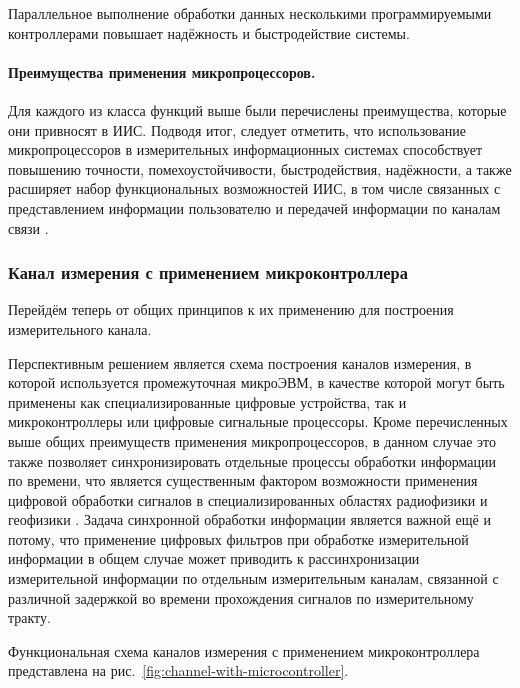 \documentclass[a4paper, 14pt, titlepage]{extarticle}
\let\oldparagraph\paragraph
\renewcommand{\paragraph}[1]{\oldparagraph{\indent #1}}
\begin{document}
  Параллельное выполнение обработки данных несколькими программируемыми
  контроллерами повышает надёжность и быстродействие системы.

  \paragraph{Преимущества применения микропроцессоров.}
  Для каждого из класса функций выше были перечислены преимущества, которые они привносят в ИИС.
  Подводя итог, следует отметить, что использование микропроцессоров в измерительных информационных системах способствует
  повышению точности, помехоустойчивости, быстродействия, надёжности, а также расширяет набор
  функциональных возможностей ИИС, в том числе связанных с представлением информации пользователю
  и передачей информации по каналам связи \cite{klaassen-methods}.

  \subsubsection{Канал измерения с применением микроконтроллера}

  Перейдём теперь от общих принципов к их применению для построения измерительного канала.

  Перспективным решением является схема построения каналов измерения, в которой
  используется промежуточная микроЭВМ, в качестве которой могут быть применены как
  специализированные цифровые устройства, так и микроконтроллеры или цифровые сигнальные процессоры.
  Кроме перечисленных выше общих преимуществ применения микропроцессоров, в данном случае это также
  позволяет синхронизировать отдельные процессы обработки информации по времени, что является
  существенным фактором возможности применения цифровой обработки сигналов в специализированных
  областях радиофизики и геофизики \cite{rathore-digital}. Задача синхронной обработки информации
  является важной ещё и потому, что применение цифровых фильтров при обработке измерительной
  информации в общем случае может приводить к рассинхронизации измерительной информации по отдельным
  измерительным каналам, связанной с различной задержкой во времени прохождения сигналов по
  измерительному тракту.

  Функциональная схема каналов измерения с применением микроконтроллера  представлена на
  рис.~\ref{fig:channel-with-microcontroller}.
\end{document}

